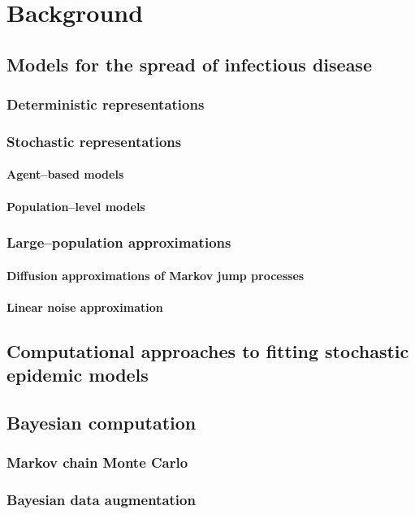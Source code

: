 \chapter{Background}
\label{chap:background}

\section{Models for the spread of infectious disease}
\label{sec:outbreak_models}

\subsection{Deterministic representations}
\label{subsec:deterministic_models}

\subsection{Stochastic representations}
\label{subsec:stochastic_models}

\subsubsection{Agent--based models}
\label{subsubsec:agent_based_models}

\subsubsection{Population--level models}
\label{subsubsec:pop_level_models}

\subsection{Large--population approximations}
\label{subsec:large_pop_approx}

\subsubsection{Diffusion approximations of Markov jump processes}
\label{subsubsec:diff_approx}

\subsubsection{Linear noise approximation}
\label{subsubsec:lna_background}

\section{Computational approaches to fitting stochastic epidemic models}
\label{sec:computational_background}

\section{Bayesian computation}
\label{sec:bayesian_computation}

\subsection{Markov chain Monte Carlo}
\label{subsec:mcmc}

\subsection{Bayesian data augmentation}
\label{subsec:data_augmentation}